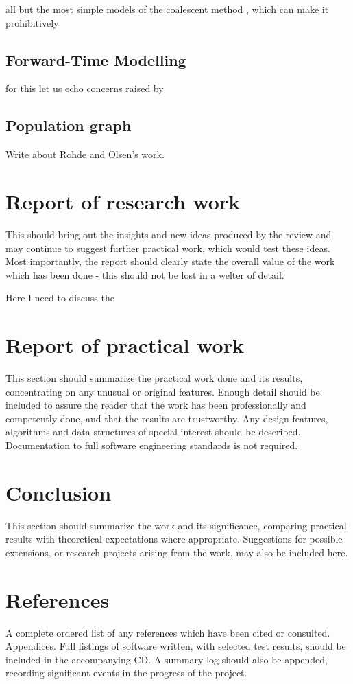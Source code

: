 \documentclass{l4proj}
\begin{document}
 all but the most simple models of the coalescent method , which can make it prohibitively

\section{Forward-Time Modelling}

for this let us echo concerns raised by \cite{peng09}

\section{Population graph}

Write about Rohde and Olsen's work. 

\chapter{Report of research work}\label{research}
This should bring out the insights and new ideas produced by the review and may continue to suggest further practical work, which would test these ideas. Most importantly, the report should clearly state the overall value of the work which has been done - this should not be lost in a welter of detail.

Here I need to discuss the 

\chapter{Report of practical work}\label{practical}
This section should summarize the practical work done and its results, concentrating on any unusual or original features. Enough detail should be included to assure the reader that the work has been professionally and competently done, and that the results are trustworthy. Any design features, algorithms and data structures of special interest should be described. Documentation to full software engineering standards is not required.

\chapter{Conclusion}\label{conclusion}
This section should summarize the work and its significance, comparing practical results with theoretical expectations where appropriate. Suggestions for possible extensions, or research projects arising from the work, may also be included here.

\chapter{References}
 A complete ordered list of any references which have been cited or consulted.
Appendices. Full listings of software written, with selected test results, should be included in the accompanying CD. A summary log should also be appended, recording significant events in the progress of the project.

\printbibliography
\end{document}
